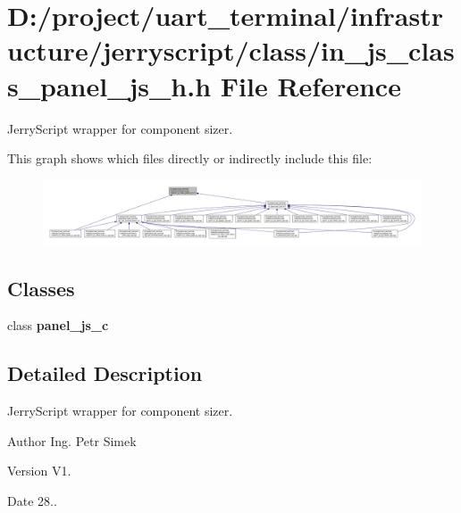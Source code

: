 \section{D\+:/project/uart\+\_\+terminal/infrastructure/jerryscript/class/in\+\_\+js\+\_\+class\+\_\+panel\+\_\+js\+\_\+h.h File Reference}
\label{in__js__class__panel__js__h_8h}


Jerry\+Script wrapper for component sizer.  


This graph shows which files directly or indirectly include this file\+:
\nopagebreak
\begin{figure}[H]
\begin{center}
\leavevmode
\includegraphics[width=350pt]{in__js__class__panel__js__h_8h__dep__incl}
\end{center}
\end{figure}
\subsection*{Classes}
\begin{DoxyCompactItemize}
\item 
class \textbf{ panel\+\_\+js\+\_\+c}
\end{DoxyCompactItemize}


\subsection{Detailed Description}
Jerry\+Script wrapper for component sizer. 

\begin{DoxyAuthor}{Author}
Ing. Petr Simek 
\end{DoxyAuthor}
\begin{DoxyVersion}{Version}
V1. 
\end{DoxyVersion}
\begin{DoxyDate}{Date}
28.. 
\end{DoxyDate}
